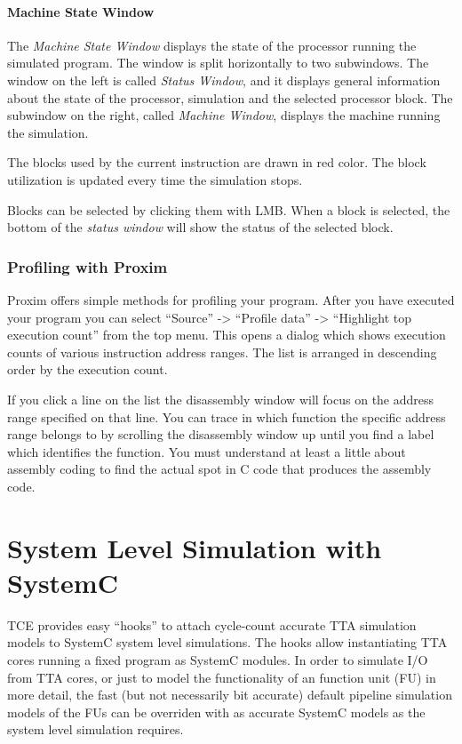 \documentclass[twoside]{tceusermanual}
\begin{document}
\paragraph{Machine State Window}

The \emph{Machine State Window}
displays the state of the processor running the simulated program.
The window is split horizontally to two subwindows. The window on the
left is called \emph{Status Window}, and it displays general information
about the state of the processor, simulation and the selected processor
block. The subwindow on the right, called \emph{Machine Window},
displays the machine running the simulation.

The blocks used by the current instruction are drawn in red color. The block
utilization is updated every time the simulation stops.

Blocks can be selected by clicking them with LMB.
When a block is selected, the bottom of the \emph{status window}
will show the status of the selected block.

\subsubsection{Profiling with Proxim}
\label{sec:ProfileProxim}

Proxim offers simple methods for profiling your program. After you have
executed your program you can select ``Source'' -> ``Profile data'' ->
``Highlight top execution count'' from the top menu. This opens a dialog which
shows execution counts of various instruction address ranges. The list is
arranged in descending order by the execution count.

If you click a line on the list the disassembly window will focus on the
address range specified on that line. You can trace in which function the
specific address range belongs to by scrolling the disassembly window up
until you find a label which identifies the function. You must understand at
least a little about assembly coding to find the actual spot in C code that
produces the assembly code.

\section{System Level Simulation with SystemC}
\label{sec:SystemC}

TCE provides easy ``hooks'' to attach cycle-count accurate TTA
simulation models to SystemC system level simulations. The hooks allow 
instantiating TTA cores running a fixed program as SystemC modules. 
In order to simulate I/O from TTA cores, or just to model the functionality 
of an function unit (FU) in more detail, the fast (but not necessarily
bit accurate) default pipeline simulation models of the FUs can be 
overriden with as accurate SystemC models as the system level simulation
requires. 
\end{document}
